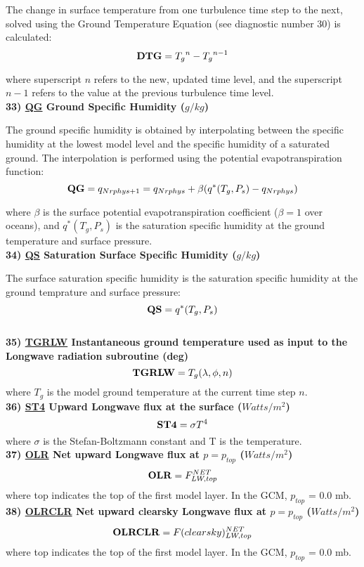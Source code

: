 \noindent
The change in surface temperature from one turbulence time step to the next, solved
using the Ground Temperature Equation (see diagnostic number 30) is calculated:
\[
{\bf DTG} = {T_g}^{n} - {T_g}^{n-1}
\]

\noindent
where superscript $n$ refers to the new, updated time level, and the superscript $n-1$
refers to the value at the previous turbulence time level.
\\
 
\noindent
{\bf 33)  \underline {QG}  Ground Specific Humidity ($g/kg$) }

\noindent
The ground specific humidity is obtained by interpolating between the specific
humidity at the lowest model level and the specific humidity of a saturated ground.
The interpolation is performed using the potential evapotranspiration function:
\[
{\bf QG} = q_{Nrphys+1} = q_{Nrphys} + \beta(q^*(T_g,P_s) - q_{Nrphys})
\]

\noindent
where $\beta$ is the surface potential evapotranspiration coefficient ($\beta=1$ over oceans), 
and $q^*(T_g,P_s)$ is the saturation specific humidity at the ground temperature and surface
pressure.
\\
 
\noindent
{\bf 34)  \underline {QS}  Saturation Surface Specific Humidity ($g/kg$) }

\noindent
The surface saturation specific humidity is the saturation specific humidity at
the ground temprature and surface pressure:
\[
{\bf QS} = q^*(T_g,P_s)
\]
\\
 
\noindent
{\bf 35)  \underline {TGRLW} Instantaneous ground temperature used as input to the Longwave
 radiation subroutine (deg)}
\[
{\bf TGRLW}  = T_g(\lambda , \phi ,n)
\]
\noindent
where $T_g$ is the model ground temperature at the current time step $n$.
\\
 
 
\noindent
{\bf 36)  \underline {ST4} Upward Longwave flux at the surface ($Watts/m^2$) }
\[
{\bf ST4} = \sigma T^4
\]
\noindent
where $\sigma$ is the Stefan-Boltzmann constant and T is the temperature.
\\
 
\noindent
{\bf 37)  \underline {OLR} Net upward Longwave flux at $p=p_{top}$ ($Watts/m^2$) }
\[
{\bf OLR}  =  F_{LW,top}^{NET}
\]
\noindent
where top indicates the top of the first model layer.
In the GCM, $p_{top}$ = 0.0 mb.
\\


\noindent
{\bf 38)  \underline {OLRCLR} Net upward clearsky Longwave flux at $p=p_{top}$ ($Watts/m^2$) }
\[
{\bf OLRCLR}  =  F(clearsky)_{LW,top}^{NET}
\]
\noindent
where top indicates the top of the first model layer.
In the GCM, $p_{top}$ = 0.0 mb.
\\

